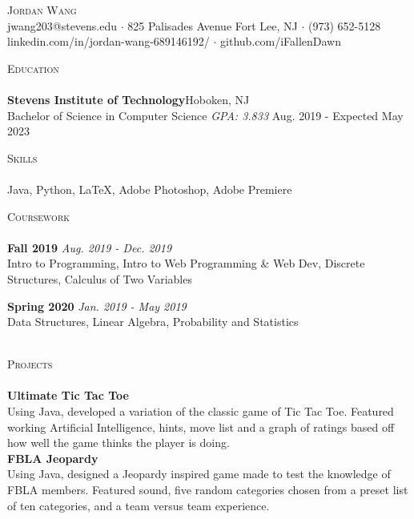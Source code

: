 \documentclass[11pt]{article}
\newcommand{\lineunder} {
    \vspace*{-8pt} \\
    \hspace*{-18pt} \hrulefill \\
}
\newcommand{\header} [1] {
    {\hspace*{-18pt}\vspace*{6pt} \textsc{#1}}
    \vspace*{-6pt} \lineunder
}
\begin{document}
\vspace*{-40pt}

    

\vspace*{2pt}
\begin{center}
	{\Huge \scshape {Jordan Wang}}\\
	jwang203@stevens.edu $\cdot$ 825 Palisades Avenue Fort Lee, NJ $\cdot$ (973) 652-5128 linkedin.com/in/jordan-wang-689146192/ $\cdot$ github.com/iFallenDawn \\
\end{center}

\header{Education}
\textbf{Stevens Institute of Technology}\hfill Hoboken, NJ\\
Bachelor of Science in Computer Science \textit{GPA: 3.833} \hfill Aug. 2019 - Expected May 2023\\
\vspace{2mm}

\header{Skills}
	Java, Python, \LaTeX, Adobe Photoshop, Adobe Premiere                    \\
\vspace{2mm}

\header{Coursework}
{\textbf{Fall 2019}} {\sl Aug. 2019 - Dec. 2019} \hfill 
\\
Intro to Programming, Intro to Web Programming \& Web Dev, Discrete Structures, Calculus of Two Variables\\
\vspace*{2mm}

{\textbf{Spring 2020}} {\sl Jan. 2019 - May 2019} \hfill 
\\
Data Structures, Linear Algebra, Probability and Statistics\\
\vspace*{2mm}
\ 

\header{Projects}
{\textbf{Ultimate Tic Tac Toe}} \hfill 
\\
Using Java, developed a variation of the classic game of Tic Tac Toe. Featured working Artificial Intelligence, hints, move list and a graph of ratings based off how well the game thinks the player is doing.\\
\vspace*{2mm}
{\textbf{FBLA Jeopardy}} \hfill 
\\
Using Java, designed a Jeopardy inspired game made to test the knowledge of FBLA members. Featured sound, five random categories chosen from a preset list of ten categories, and a team versus team experience.\\
\vspace*{2mm}
\ 
\end{document}

